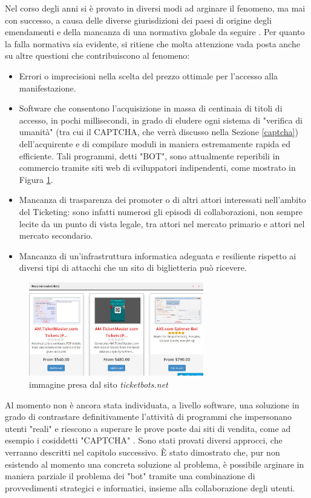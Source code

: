 Nel corso degli anni si è provato in diversi modi ad arginare il fenomeno, ma mai con successo, a causa delle diverse giurisdizioni dei paesi di origine degli emendamenti e della mancanza di una normativa globale da seguire \cite{tompkins2018ticket, elefant2018beyond}. 
Per quanto la falla normativa sia evidente, si ritiene che molta attenzione vada posta anche su altre questioni che contribuiscono al fenomeno: 
\begin{itemize}
\item Errori o imprecisioni nella scelta del prezzo ottimale per l'accesso alla manifestazione. 
\item Software che consentono l'acquisizione in massa di centinaia di titoli di accesso, in pochi millisecondi, in grado di eludere ogni sistema di "verifica di umanità" (tra cui il CAPTCHA, che verrà discusso nella Sezione \ref{captcha})  dell'acquirente e di compilare moduli in maniera estremamente rapida ed efficiente. Tali programmi, detti "BOT", sono attualmente reperibili in commercio tramite siti web di sviluppatori indipendenti, come mostrato in Figura \ref{buybot}.
\item Mancanza di trasparenza dei promoter o di altri attori interessati nell'ambito del Ticketing: sono infatti numerosi gli episodi di collaborazioni, non sempre lecite da un punto di vista legale, tra attori nel mercato primario e attori nel mercato secondario. 
\item Mancanza di un'infrastruttura informatica adeguata e resiliente rispetto ai diversi tipi di attacchi che un sito di biglietteria può ricevere. 
\end{itemize}
\begin{figure}[H]
	\centering
	\includegraphics[width=0.68\textwidth]{chapter2/immagini/buybot}
	\caption{immagine presa dal sito \textit{ticketbots.net}}
	\label{buybot}
\end{figure}
Al momento non è ancora stata individuata, a livello software, una soluzione in grado di contrastare definitivamente l'attività di programmi che impersonano utenti "reali" e riescono a superare le prove poste dai siti di vendita, come ad esempio i cosiddetti "CAPTCHA" . Sono stati provati diversi approcci, che verranno descritti nel capitolo successivo. \`E stato dimostrato che, pur non esistendo al momento una concreta soluzione al problema, è possibile arginare in maniera parziale il problema dei "bot" tramite una combinazione di provvedimenti strategici e informatici, insieme alla collaborazione degli utenti. 

